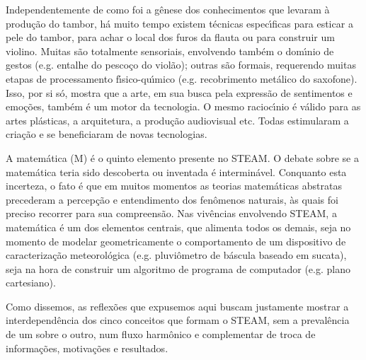 \documentclass[
12pt,		%
openright,	%
twoside,  %
a4paper,			%
chapter=TITLE,		%
english,			%
french,				%
spanish,			%
brazil				%
]{USPSC-classe/USPSC}
\begin{document}
Independentemente de como foi a g\^enese dos conhecimentos que levaram \`a produ\c{c}\~ao do tambor, h\'a muito tempo existem t\'ecnicas espec\'{\i}ficas para esticar a pele do tambor, para achar o local dos furos da flauta ou para construir um violino. Muitas s\~ao totalmente sensoriais, envolvendo tamb\'em o dom\'{\i}nio de gestos (e.g. entalhe do pesco\c{c}o do viol\~ao); outras s\~ao formais, requerendo muitas etapas de processamento f\'{\i}sico-qu\'{\i}mico (e.g. recobrimento met\'alico do saxofone). Isso, por si s\'o, mostra que a arte, em sua busca pela express\~ao de sentimentos e emo\c{c}\~oes, tamb\'em \'e um motor da tecnologia. O mesmo racioc\'{\i}nio \'e v\'alido para as artes pl\'asticas, a arquitetura, a produ\c{c}\~ao audiovisual etc. Todas estimularam a cria\c{c}\~ao e se beneficiaram de novas tecnologias.

















A matem\'atica (M) \'e o quinto elemento presente no STEAM. O debate sobre se a matem\'atica teria sido descoberta ou inventada \'e intermin\'avel. Conquanto esta incerteza, o fato \'e que em muitos momentos as teorias matem\'aticas abstratas precederam a percep\c{c}\~ao e entendimento dos fen\^omenos naturais, \`as quais foi preciso recorrer para sua compreens\~ao. Nas viv\^encias envolvendo STEAM, a matem\'atica \'e um dos elementos centrais, que alimenta todos os demais, seja no momento de modelar geometricamente o comportamento de um dispositivo de caracteriza\c{c}\~ao meteorol\'ogica (e.g. pluvi\^ometro de b\'ascula baseado em sucata), seja na hora de construir um algoritmo de programa de computador (e.g. plano cartesiano).

















Como dissemos, as reflex\~oes que expusemos aqui buscam justamente mostrar a interdepend\^encia dos cinco conceitos que formam o STEAM, sem a preval\^encia de um sobre o outro, num fluxo harm\^onico e complementar de troca de informa\c{c}\~oes, motiva\c{c}\~oes e resultados.
\end{document}
